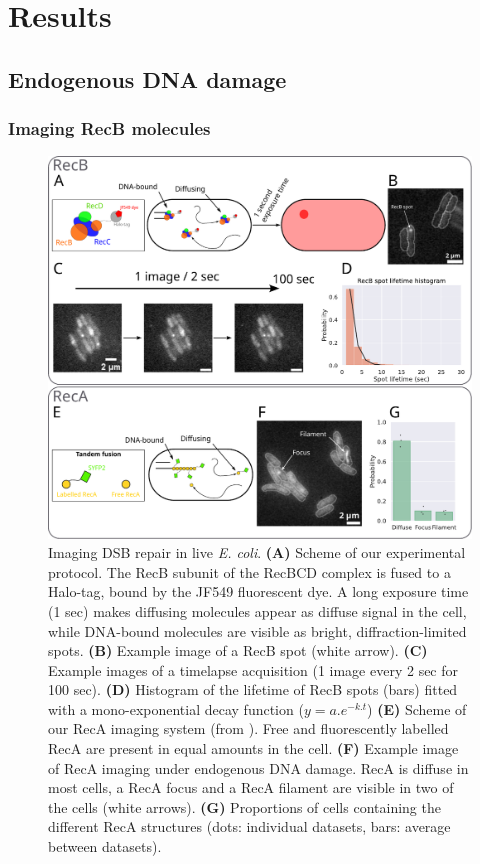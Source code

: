 \section*{Results}

\subsection*{Endogenous DNA damage}

\subsubsection*{Imaging RecB molecules}

\begin{figure}[htbp]
    \centering
    \includegraphics[width=.8\textwidth]{Figures/Fig1_endogenous.pdf}
    \caption{Imaging DSB repair in live \textit{E. coli}. \textbf{(A)} Scheme of our experimental protocol. The RecB subunit of the RecBCD complex is fused to a Halo-tag, bound by the JF549 fluorescent dye. A long exposure time (1 sec) makes diffusing molecules appear as diffuse signal in the cell, while DNA-bound molecules are visible as bright, diffraction-limited spots. \textbf{(B)} Example image of a RecB spot (white arrow). \textbf{(C)} Example images of a timelapse acquisition (1 image every 2 sec for 100 sec). \textbf{(D)} Histogram of the lifetime of RecB spots (bars) fitted with a mono-exponential decay function ($y=a.e^{-k.t}$) \textbf{(E)} Scheme of our RecA imaging system (from \cite{Wiktor2021}). Free and fluorescently labelled RecA are present in equal amounts in the cell. \textbf{(F)} Example image of RecA imaging under endogenous DNA damage. RecA is diffuse in most cells, a RecA focus and a RecA filament are visible in two of the cells (white arrows). \textbf{(G)} Proportions of cells containing the different RecA structures (dots: individual datasets, bars: average between datasets).}
    \label{Fig:endogenous}
\end{figure}

